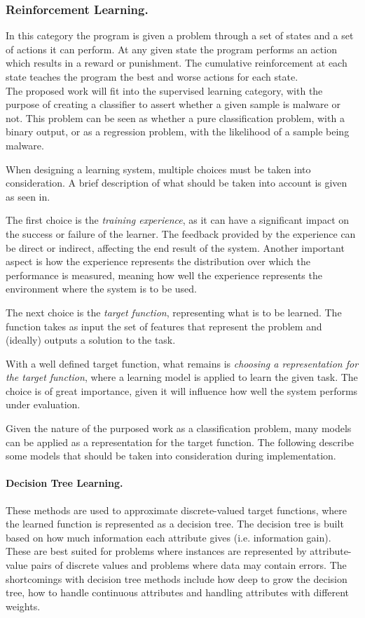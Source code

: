 \documentclass{llncs}
\begin{document}
\subsubsection{Reinforcement Learning.} In this category the program is given a problem through a set of states and a set of actions it can perform. At any given state the program performs an action which results in a reward or punishment. The cumulative reinforcement at each state teaches the program the best and worse actions for each state.\\

The proposed work will fit into the supervised learning category, with the purpose of creating a classifier to assert whether a given sample is malware or not. This problem can be seen as whether a pure classification problem, with a binary output, or as a regression problem, with the likelihood of a sample being malware.

When designing a learning system, multiple choices must be taken into consideration. A brief description of what should be taken into account is given as seen in\cite{mitchell:ml}.

The first choice is the \textit{training experience}, as it can have a significant impact on the success or failure of the learner. The feedback provided by the experience can be direct or indirect, affecting the end result of the system. Another important aspect is how the experience represents the distribution over which the performance is measured, meaning how well the experience represents the environment where the system is to be used.

The next choice is the \textit{target function}, representing what is to be learned. The function takes as input the set of features that represent the problem and (ideally) outputs a solution to the task.

With a well defined target function, what remains is \textit{choosing a representation for the target function}, where a learning model is applied to learn the given task. The choice is of great importance, given it will influence how well the system performs under evaluation.

Given the nature of the purposed work as a classification problem, many models can be applied as a representation for the target function. The following describe some models that should be taken into consideration during implementation.

\paragraph{Decision Tree Learning.}\cite{mitchell:ml} These methods are used to approximate discrete-valued target functions, where the learned function is represented as a decision tree. The decision tree is built based on how much information each attribute gives (i.e. information gain). These are best suited for problems where instances are represented by attribute-value pairs of discrete values and problems where data may contain errors. The shortcomings with decision tree methods include how deep to grow the decision tree, how to handle continuous attributes and handling attributes with different weights.
\end{document}
